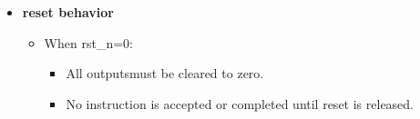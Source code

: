 \begin{itemize}
    \item \textbf{reset behavior}
    \begin{itemize}
        \item When rst\_n=0:
         \begin{itemize}
            \item All outputsmust be cleared to zero.
            \item No instruction is accepted or completed until reset is released.
        \end{itemize}       
    \end{itemize}
\end{itemize}
